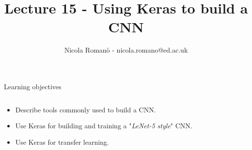 \documentclass[9pt, aspectratio=169]{beamer}
\author{Nicola Roman\`o - nicola.romano@ed.ac.uk}
\title{Lecture 15 - Using Keras to build a CNN}
\date{}
\begin{document}

\begin{frame}
    \titlepage
\end{frame}

\begin{frame}
    {Learning objectives}
    \begin{columns}
        \begin{column}{0.8\textwidth}
            \begin{itemize}
                \item Describe tools commonly used to build a CNN.
                \item Use Keras for building and training a "\textit{LeNet-5 style}" CNN.
                \item Use Keras for transfer learning.
            \end{itemize}
        \end{column}
        \begin{column}{0.2\textwidth}

\end{column}
\end{columns}
\end{frame}
\end{document}
